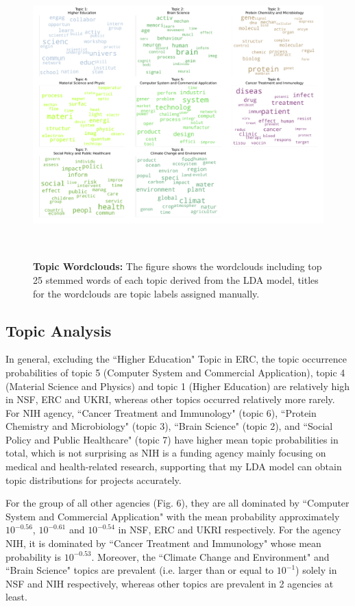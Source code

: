 \begin{figure}[H]
    \centering
    \includegraphics[width = 16cm, height = 11cm]{Code/img/keywords_word_cloud.pdf}
    \caption[Eight wordclouds of top 25 stemmed words]{\textbf{Topic Wordclouds:} The figure shows the wordclouds including top 25 stemmed words of each topic derived from the LDA model, titles for the wordclouds are topic labels assigned manually.}
\end{figure}

\subsection{Topic Analysis}

In general, excluding the ``Higher Education" Topic in ERC, the topic occurrence probabilities of topic 5 (Computer System and Commercial Application), topic 4 (Material Science and Physics) and topic 1 (Higher Education) are relatively high in NSF, ERC and UKRI, whereas other topics occurred relatively more rarely. For NIH agency, ``Cancer Treatment and Immunology" (topic 6), ``Protein Chemistry and Microbiology" (topic 3), ``Brain Science" (topic 2),  and ``Social Policy and Public Healthcare" (topic 7) have higher mean topic probabilities in total, which is not surprising as NIH is a funding agency mainly focusing on medical and health-related research, supporting that my LDA model can obtain topic distributions for projects accurately.

For the group of all other agencies (Fig. 6), they are all dominated by ``Computer System and Commercial Application" with the mean probability approximately $10^{-0.56}$, $10^{-0.61}$ and $10^{-0.54}$ in NSF, ERC and UKRI respectively. For the agency NIH, it is dominated by ``Cancer Treatment and Immunology" whose mean probability is $10^{-0.53}$. Moreover, the ``Climate Change and Environment" and ``Brain Science" topics are prevalent (i.e. larger than or equal to $10^{-1}$) solely in NSF and NIH respectively, whereas other topics are prevalent in 2 agencies at least.

